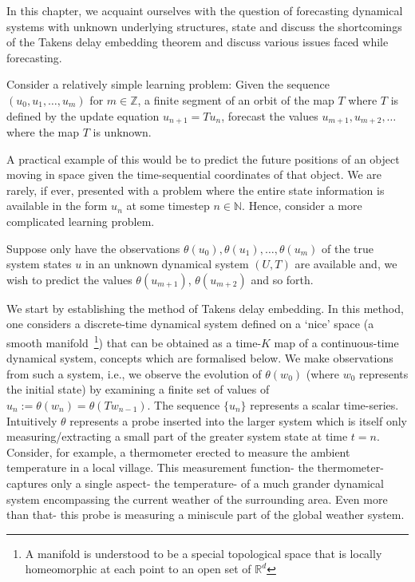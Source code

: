 In this chapter, we acquaint ourselves with the question of forecasting dynamical systems with unknown underlying structures, state and discuss the shortcomings of the Takens delay embedding theorem and discuss various issues faced while forecasting. 

Consider a relatively simple learning problem:
Given the sequence $(u_0, u_1, \ldots, u_m)$ for $m\in\mathbb{Z}$, a finite segment of an orbit of the map $T$ where $T$ is defined by the update equation $u_{n+1} = Tu_n$, forecast the values $u_{m+1}, u_{m+2}, \ldots$ where the map $T$ is unknown. 

A practical example of this would be to predict the future positions of an object moving in space given the time-sequential coordinates of that object. 
We are rarely, if ever, presented with a problem where the entire state information is available in the form $u_n$ at some timestep $n\in\mathbb{N}$.
Hence, consider a more complicated learning problem.

Suppose only have the observations $\theta(u_0), \theta(u_1), \ldots, \theta(u_m)$ of the true system states $u$ in an unknown dynamical system $(U,T)$ are available and, we wish to predict the values $\theta(u_{m+1})$, $\theta(u_{m+2})$ and so forth.

We start by establishing the method of Takens delay embedding. 
In this method, one considers a discrete-time dynamical system defined on a `nice' space 
(a smooth manifold~\footnote{A manifold is understood to be a special topological space that is locally homeomorphic at each point to an open set of $\mathbb{R}^d$})
that can be obtained as a time-$K$ map of a continuous-time dynamical system, concepts which are formalised below.
We make observations from such a system, i.e., we observe the evolution of $\theta(w_0)$ (where $w_0$ represents the initial state) by examining  a finite set of values of $u_n :=  \theta(w_n) = \theta(Tw_{n-1})$. The sequence $\{u_n\}$ represents a scalar time-series. Intuitively $\theta$ represents a probe inserted into the larger system which is itself only measuring/extracting a small part of the greater system state at time $t=n$. 
Consider, for example, a thermometer erected to measure the ambient temperature in a local village. This measurement function- the thermometer- captures only a single aspect- the temperature- of a much grander dynamical system encompassing the current weather of the surrounding area. Even more than that- this probe is measuring a miniscule part of the global weather system. 


